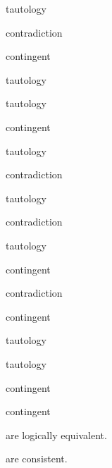\begin{earg}
\item tautology
\item contradiction
\item contingent
\item tautology
\item tautology
\item contingent
\item tautology
\item contradiction
\item tautology
\item contradiction
\item tautology
\item contingent
\item contradiction
\item contingent
\item tautology
\item tautology
\item contingent
\item contingent
\end{earg}

\noSeq
\nextSeq
\nextSeq
\noSeq
\nextSeq
\nextSeq
\noSeq
\nextSeq
\lastSeq
\noSeq
are logically equivalent.

\nextSeq
\noSeq
\nextSeq
\noSeq
\noSeq
\nextSeq
\nextSeq
\lastSeq
are consistent.

